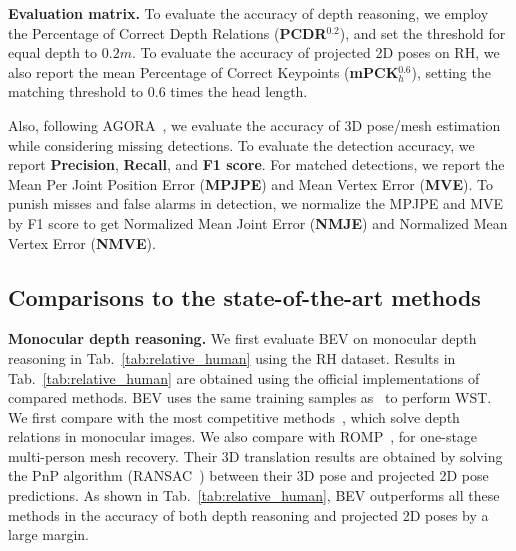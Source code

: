 \documentclass[10pt,twocolumn,letterpaper]{article}
\begin{document}
\textbf{Evaluation matrix.}
To evaluate the accuracy of depth reasoning, we employ the Percentage of Correct Depth Relations (\textbf{PCDR$^{0.2}$}), and set the threshold for equal depth to $0.2m$.
To evaluate the accuracy of projected 2D poses on RH, we also report the mean Percentage of Correct Keypoints (\textbf{mPCK$_{h}^{0.6}$}),  setting the matching threshold to $0.6$ times the head length.

Also, following AGORA~\cite{patel2021agora}, we evaluate the accuracy of 3D pose/mesh estimation while considering missing detections.
To evaluate the detection accuracy, we report \textbf{Precision}, \textbf{Recall}, and \textbf{F1 score}. For matched detections, we report the Mean Per Joint Position Error (\textbf{MPJPE}) and Mean Vertex Error (\textbf{MVE}). 
To punish misses and false alarms in detection, we normalize the MPJPE and MVE by F1 score to get Normalized Mean Joint Error (\textbf{NMJE}) and Normalized Mean Vertex Error (\textbf{NMVE}). 


\subsection{Comparisons to the state-of-the-art methods}

\textbf{Monocular depth reasoning.}
We first evaluate BEV on monocular depth reasoning in Tab.~\ref{tab:relative_human} using the RH dataset.
Results in Tab.~\ref{tab:relative_human} are obtained using the official implementations of compared methods. 
BEV uses the same training samples as~\cite{romp} to perform WST.
We first compare with the most competitive methods~\cite{moon2019camera,jiang2020coherent,zhen2020smap}, which solve depth relations in monocular images.
We also compare with ROMP~\cite{romp}, for one-stage multi-person mesh recovery.
Their 3D translation results are obtained by solving the PnP algorithm (RANSAC~\cite{fischler1981random}) between their 3D pose and projected 2D pose predictions.
As shown in Tab.~\ref{tab:relative_human}, BEV outperforms all these methods in the accuracy of both depth reasoning and projected 2D poses by a large margin.
\end{document}
